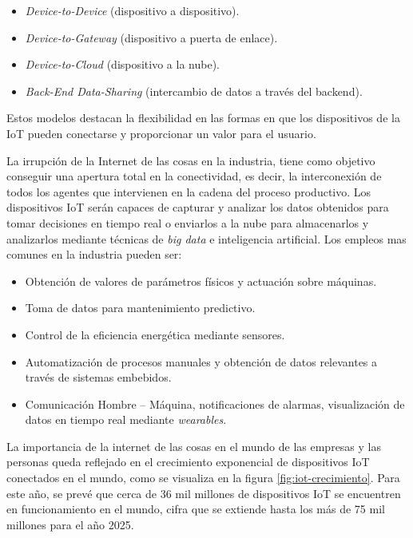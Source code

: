 \begin{itemize}
	\item \textit{Device-to-Device} (dispositivo a dispositivo).
	\item \textit{Device-to-Gateway} (dispositivo a puerta de enlace).
	\item \textit{Device-to-Cloud} (dispositivo a la nube).
	\item \textit{Back-End Data-Sharing} (intercambio de datos a través del backend).
\end{itemize}

Estos modelos destacan la flexibilidad en las formas en que los dispositivos de la IoT pueden conectarse y proporcionar un valor para el usuario.

La irrupción de la Internet de las cosas en la industria, tiene como objetivo conseguir una apertura total en la conectividad, es decir, la interconexión de todos los agentes que intervienen en la cadena del proceso productivo. Los dispositivos IoT serán capaces de capturar y analizar los datos obtenidos para tomar decisiones en tiempo real o enviarlos a la nube para almacenarlos y analizarlos mediante técnicas de \textit{big data}  e inteligencia artificial. Los empleos mas comunes en la industria pueden ser:
\begin{itemize}
	\item Obtención de valores de parámetros físicos y actuación sobre máquinas.
	\item Toma de datos para mantenimiento predictivo. 
	\item Control de la eficiencia energética mediante sensores.
	\item Automatización de procesos manuales y obtención de datos relevantes a través de sistemas embebidos.
	\item Comunicación Hombre – Máquina, notificaciones de alarmas, visualización de datos en tiempo real mediante \textit{wearables}.
\end{itemize}

La importancia de la internet de las cosas en el mundo de las empresas y las personas queda reflejado en el crecimiento exponencial de dispositivos IoT conectados en el mundo, como se visualiza en la figura  \ref{fig:iot-crecimiento}. Para este año, se prevé que cerca de 36 mil millones de dispositivos IoT se encuentren en funcionamiento en el mundo, cifra que se extiende hasta los más de 75 mil millones para el año 2025.


